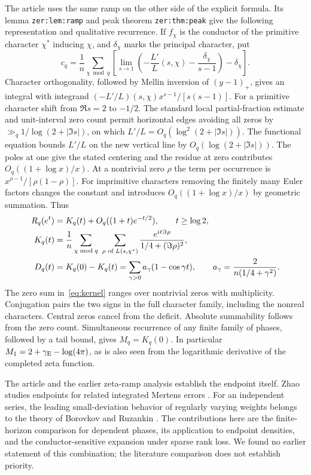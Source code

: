 \documentclass[11pt]{article}
\begin{document}
The article \cite{article} uses the same ramp on the other side of the explicit formula. Its lemma \texttt{zer:lem:ramp} and peak theorem \texttt{zer:thm:peak} give the following representation and qualitative recurrence. If $f_\chi$ is the conductor of the primitive character $\chi^*$ inducing $\chi$, and $\delta_\chi$ marks the principal character, put
\[
 c_q=\frac1n\sum_{\chi\bmod q}\left[
 \lim_{s\to1}\left(-\frac{L'}L(s,\chi)-\frac{\delta_\chi}{s-1}\right)-\delta_\chi\right].
\]
Character orthogonality, followed by Mellin inversion of $(y-1)_+$, gives an integral with integrand $(-L'/L)(s,\chi)x^{s-1}/[s(s-1)]$. For a primitive character shift from $\Re s=2$ to $-1/2$. The standard local partial-fraction estimate and unit-interval zero count permit horizontal edges avoiding all zeros by $\gg_q1/\log(2+|\Im s|)$, on which $L'/L=O_q(\log^2(2+|\Im s|))$. The functional equation bounds $L'/L$ on the new vertical line by $O_q(\log(2+|\Im s|))$. The poles at one give the stated centering and the residue at zero contributes $O_q((1+\log x)/x)$. At a nontrivial zero $\rho$ the term per occurrence is $x^{\rho-1}/[\rho(1-\rho)]$. For imprimitive characters removing the finitely many Euler factors changes the constant and introduces $O_q((1+\log x)/x)$ by geometric summation. Thus
\begin{align}
 R_q(e^t)&=K_q(t)+O_q((1+t)e^{-t/2}),\qquad t\ge\log 2,\notag\\
 K_q(t)&=\frac1n\sum_{\chi\bmod q}\ \sum_{\rho\text{ of }L(s,\chi^*)}
 \frac{e^{it\Im\rho}}{1/4+(\Im\rho)^2},\label{eq:kernel}\\
 D_q(t)&=K_q(0)-K_q(t)=\sum_{\gamma>0}a_\gamma(1-\cos\gamma t),
 \qquad a_\gamma=\frac{2}{n(1/4+\gamma^2)}.\label{eq:deficit}
\end{align}
The zero sum in~\eqref{eq:kernel} ranges over nontrivial zeros with multiplicity. Conjugation pairs the two signs in the full character family, including the nonreal characters. Central zeros cancel from the deficit. Absolute summability follows from the zero count. Simultaneous recurrence of any finite family of phases, followed by a tail bound, gives $M_q=K_q(0)$. In particular $M_1=2+\gamma_{\rm E}-\log(4\pi)$, as is also seen from the logarithmic derivative of the completed zeta function.

The article and the earlier zeta-ramp analysis \cite{rstation} establish the endpoint itself. Zhao studies endpoints for related integrated Mertens errors \cite{zhao}. For an independent series, the leading small-deviation behavior of regularly varying weights belongs to the theory of Borovkov and Ruzankin \cite{br}. The contributions here are the finite-horizon comparison for dependent phases, its application to endpoint densities, and the conductor-sensitive expansion under sparse rank loss. We found no earlier statement of this combination; the literature comparison does not establish priority.
\end{document}
